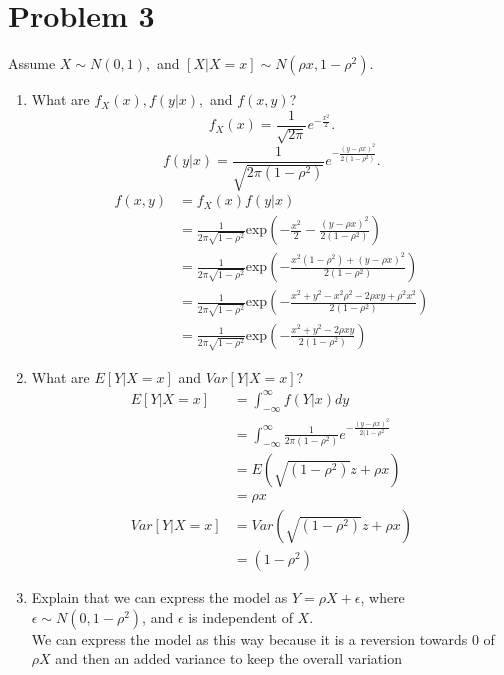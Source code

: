 \documentclass{article}
\begin{document}
    \section{Problem 3}
    Assume $X \sim N(0,1),$ and $[X|X=x] \sim N(\rho x, 1-\rho^2).$
    \begin{enumerate}
        \item What are $f_X(x), f(y|x),$ and $f(x,y)$?
            \[
            f_X(x) = \frac{1}{\sqrt{2\pi }}e^{-\frac{x^2}{2}}
            .\] 
            \[
            f(y|x) = \frac{1}{\sqrt{2\pi (1-\rho^2)}}e^{-\frac{(y-\rho x)^2}{2(1-\rho^2)}}
            .\] 
            \begin{align*}
                f(x,y) &= f_X(x)f(y|x)\\ 
                       &= \frac{1}{2\pi \sqrt{1-\rho ^2}}\text{exp}(-\frac{x^2}{2}-\frac{(y-\rho x)^2}{2(1-\rho^2)})\\
                       &= \frac{1}{2\pi \sqrt{1-\rho ^2}}\text{exp}(-\frac{x^2(1-\rho ^2)+(y-\rho x)^2}{2(1-\rho ^2)})\\
                       &= \frac{1}{2\pi \sqrt{1-\rho ^2}}\text{exp}(-\frac{x^2+y^2-x^2\rho ^2-2\rho xy+\rho ^2x^2}{2(1-\rho ^2)})\\
                       &= \frac{1}{2\pi \sqrt{1-\rho ^2}}\text{exp}(-\frac{x^2+y^2-2\rho xy}{2(1-\rho ^2)})
            \end{align*}
        \item What are $E[Y|X = x]$ and $Var[Y|X = x]$?
            \begin{align*}
                E[Y|X=x] &= \int_{-\infty}^{\infty}f(Y|x)dy\\
                         &= \int_{-\infty}^{\infty}\frac{1}{2\pi (1-\rho ^2)}e^{-\frac{(y-\rho x)^2}{2(1-\rho ^2}}\\
                         &= E(\sqrt{(1-\rho ^2)}z+\rho x)\\
                         &= \rho x\\
                Var[Y|X=x] &= Var(\sqrt{(1-\rho^2)}z+\rho x)\\
                           &= (1-\rho^2 )
            \end{align*}
        \item Explain that we can express the model as $Y = \rho X + \epsilon $, where $\epsilon \sim N(0,1-\rho ^2)$, and $\epsilon $ is independent of $X$.\\
            We can express the model as this way because it is a reversion towards 0 of $\rho X$ and then an added variance to keep the overall variation

\end{enumerate}
\end{document}
